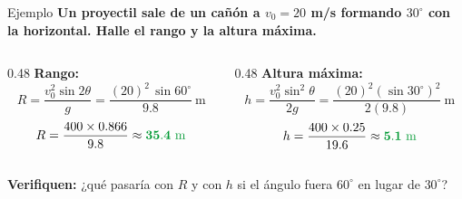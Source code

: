 \documentclass[aspectratio=169,xcolor=dvipsnames]{beamer}
\begin{document}
	\begin{frame}{Ejemplo}
		\small
		\textbf{Un proyectil sale de un cañón a $v_0 = 20$ m/s formando $30^\circ$ con la horizontal.
			Halle el rango y la altura máxima.}
		
		\vspace{0.3cm}
		\begin{columns}[T]
			\begin{column}{0.48\textwidth}
				\textbf{Rango:}
				\[
				R = \frac{v_0^2 \sin 2\theta}{g} = \frac{(20)^2\,\sin 60^\circ}{9.8}\ \text{m}
				\]
				\[
				R = \frac{400 \times 0.866}{9.8} \approx \textcolor{UnalGreen}{\mathbf{35.4\ \text{m}}}
				\]
			\end{column}
			\begin{column}{0.48\textwidth}
				\textbf{Altura máxima:}
				\[
				h = \frac{v_0^2 \sin^2\theta}{2g} = \frac{(20)^2 (\sin 30^\circ)^2}{2(9.8)}\ \text{m}
				\]
				\[
				h = \frac{400 \times 0.25}{19.6} \approx \textcolor{UnalGreen}{\mathbf{5.1\ \text{m}}}
				\]
			\end{column}
		\end{columns}
		
		\vspace{0.4cm}
		\begin{center}
			\small \textcolor{UnalGreen}{\textbf{Verifiquen:}} ¿qué pasaría con $R$ y con $h$ si el ángulo fuera $60^\circ$
			en lugar de $30^\circ$?
		\end{center}
	\end{frame}
	
\end{document}

